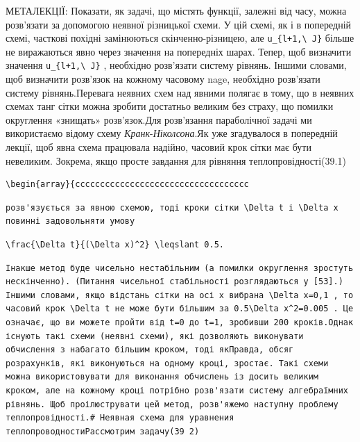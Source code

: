 \documentclass[
  ukrainian,
]{article}
\begin{document}
МЕТАЛЕКЦІЇ: Показати, як задачі, що містять функції, залежні від часу,
можна розв'язати за допомогою неявної різницької схеми. У цій схемі, як
і в попередній схемі, часткові похідні замінюються скінченно-різницею,
але \texttt{u\_\{l+1,\textbackslash{}\ J\}} більше не виражаються явно
через значення на попередніх шарах. Тепер, щоб визначити значення
\texttt{u\_\{l+1,\textbackslash{}\ J\}} , необхідно розв'язати систему
рівнянь. Іншими словами, щоб визначити розв'язок на кожному часовому
nage, необхідно розв'язати систему рівнянь.Перевага неявних схем над
явними полягає в тому, що в неявних схемах танг сітки можна зробити
достатньо великим без страху, що помилки округлення «знищать»
розв'язок.Для розв'язання параболічної задачі ми використаємо відому
схему \emph{Кранк}-\emph{Ніколсона}.Як уже згадувалося в попередній
лекції, щоб явна схема працювала надійно, часовий крок сітки має бути
невеликим. Зокрема, якщо просте завдання для рівняння
теплопровідності(39.1)

\begin{verbatim}
\begin{array}{ccccccccccccccccccccccccccccccccccc
\end{verbatim}

\begin{verbatim}
розв'язується за явною схемою, тоді кроки сітки \Delta t і \Delta x повинні задовольняти умову
\end{verbatim}

\begin{verbatim}
\frac{\Delta t}{(\Delta x)^2} \leqslant 0.5.
\end{verbatim}

\begin{verbatim}
Інакше метод буде чисельно нестабільним (а помилки округлення зростуть нескінченно). (Питання чисельної стабільності розглядаються у [53].) Іншими словами, якщо відстань сітки на осі x вибрана \Delta x=0,1 , то часовий крок \Delta t не може бути більшим за 0.5\Delta x^2=0.005 . Це означає, що ви можете пройти від t=0 до t=1, зробивши 200 кроків.Однак існують такі схеми (неявні схеми), які дозволяють виконувати обчислення з набагато більшим кроком, тоді якПравда, обсяг розрахунків, які виконуються на одному кроці, зростає. Такі схеми можна використовувати для виконання обчислень із досить великим кроком, але на кожному кроці потрібно розв'язати систему алгебраїмних рівнянь. Щоб проілюструвати цей метод, розв'яжемо наступну проблему теплопровідності.# Неявная схема для уравнения теплопроводностиРассмотрим задачу(39 2)
\end{verbatim}
\end{document}
